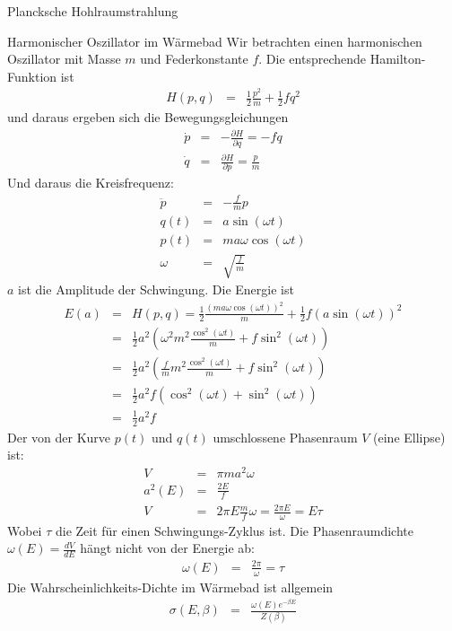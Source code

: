 \begin{chapter}{\titlestr}
\begin{section}{Plancksche Hohlraumstrahlung}
\begin{subsection}{Harmonischer Oszillator im Wärmebad}
Wir betrachten einen harmonischen Oszillator mit Masse $m$ und Federkonstante $f$. Die entsprechende Hamilton-Funktion ist
\begin{eqnarray*}
H(p,q) &=& \frac{1}{2}\frac{p^2}{m}+\frac{1}{2}fq^2
\end{eqnarray*}
und daraus ergeben sich die Bewegungsgleichungen
\begin{eqnarray*}
\dot{p} &=& -\frac{\partial H}{\partial q} = -fq\\
\dot{q} &=& \frac{\partial H}{\partial p} = \frac{p}{m}
\end{eqnarray*}
Und daraus die Kreisfrequenz:
\begin{eqnarray*}
\ddot{p} &=& -\frac{f}{m}p\\
q(t) &=& a\sin(\omega t)\\
p(t) &=& ma\omega\cos(\omega t)\\
\omega &=& \sqrt{\frac{f}{m}}
\end{eqnarray*}
$a$ ist die Amplitude der Schwingung. Die Energie ist
\begin{eqnarray*}
E(a) &=& H(p,q) = \frac{1}{2}\frac{\left(ma\omega\cos(\omega t)\right)^2}{m}+\frac{1}{2}f\left(a\sin(\omega t)\right)^2\\
&=& \frac{1}{2}a^2\left(\omega^2m^2\frac{\cos^2(\omega t)}{m}+f\sin^2(\omega t)\right)\\
&=& \frac{1}{2}a^2\left(\frac{f}{m}m^2\frac{\cos^2(\omega t)}{m}+f\sin^2(\omega t)\right)\\
&=& \frac{1}{2}a^2f\left(\cos^2(\omega t)+\sin^2(\omega t)\right)\\
&=& \frac{1}{2}a^2f
\end{eqnarray*}
Der von der Kurve $p(t)$ und $q(t)$ umschlossene Phasenraum $V$ (eine Ellipse) ist:
\begin{eqnarray*}
V &=& \pi ma^2\omega\\
a^2(E) &=& \frac{2E}{f}\\
V &=& 2\pi E\frac{m}{f}\omega=\frac{2\pi E}{\omega}=E\tau
\end{eqnarray*}
Wobei $\tau$ die Zeit für einen Schwingungs-Zyklus ist. Die Phasenraumdichte $\omega(E)=\frac{dV}{dE}$ hängt nicht von der Energie ab:
\begin{eqnarray*}
\omega(E)&=&\frac{2\pi}{\omega}=\tau
\end{eqnarray*}
Die Wahrscheinlichkeits-Dichte im Wärmebad ist allgemein
\begin{eqnarray*}
\sigma(E,\beta)&=& \frac{\omega(E)e^{-\beta E}}{Z(\beta)}\\

\end{eqnarray*}
\end{subsection}
\end{section}
\end{chapter}
